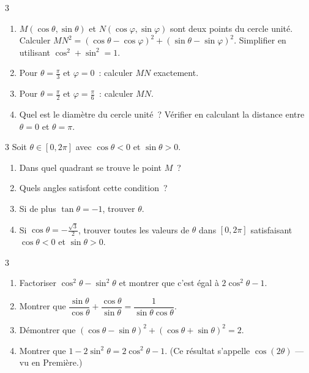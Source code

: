 \begin{exo}{3}
\begin{enumerate}
  \item $M(\cos\theta,\sin\theta)$ et $N(\cos\varphi,\sin\varphi)$ sont deux
        points du cercle unit\'e.
        Calculer $MN^2 = (\cos\theta-\cos\varphi)^2+(\sin\theta-\sin\varphi)^2$.
        Simplifier en utilisant $\cos^2+\sin^2=1$.
  \item Pour $\theta=\frac{\pi}{3}$ et $\varphi=0$~: calculer $MN$ exactement.
  \item Pour $\theta=\frac{\pi}{2}$ et $\varphi=\frac{\pi}{6}$~: calculer $MN$.
  \item Quel est le diam\`etre du cercle unit\'e~?
        V\'erifier en calculant la distance entre $\theta=0$ et $\theta=\pi$.
\end{enumerate}
\end{exo}

\begin{exo}{3}
Soit $\theta\in[0,2\pi]$ avec $\cos\theta<0$ et $\sin\theta>0$.
\begin{enumerate}
  \item Dans quel quadrant se trouve le point $M$~?
  \item Quels angles satisfont cette condition~?
  \item Si de plus $\tan\theta=-1$, trouver $\theta$.
  \item Si $\cos\theta=-\frac{\sqrt{3}}{2}$, trouver toutes les valeurs de $\theta$
        dans $[0,2\pi]$ satisfaisant $\cos\theta<0$ et $\sin\theta>0$.
\end{enumerate}
\end{exo}

\begin{exo}{3}
\begin{enumerate}
  \item Factoriser $\cos^2\theta-\sin^2\theta$ et montrer que c'est \'egal
        \`a $2\cos^2\theta-1$.
  \item Montrer que $\dfrac{\sin\theta}{\cos\theta}+\dfrac{\cos\theta}{\sin\theta}
        = \dfrac{1}{\sin\theta\cos\theta}$.
  \item D\'emontrer que $(\cos\theta-\sin\theta)^2+(\cos\theta+\sin\theta)^2=2$.
  \item Montrer que $1-2\sin^2\theta = 2\cos^2\theta-1$.
        (Ce r\'esultat s'appelle $\cos(2\theta)$ --- vu en Premi\`ere.)
\end{enumerate}
\end{exo}

